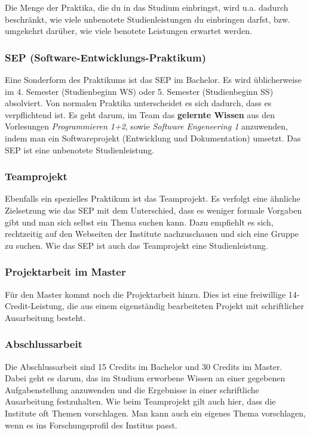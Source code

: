 	Die Menge der Praktika, die du in das Studium einbringst, wird u.a. dadurch beschränkt, wie viele unbenotete Studienleistungen du einbringen darfst, bzw. umgekehrt darüber, wie viele benotete Leistungen erwartet werden.

	\subsubsection*{SEP (Software-Entwicklungs-Praktikum)}
	Eine Sonderform des Praktikums ist das SEP im Bachelor. Es wird üblicherweise im 4. Semester (Studienbeginn WS) oder 5. Semester (Studienbeginn SS) absolviert. Von normalen Praktika unterscheidet es sich dadurch, dass es verpflichtend ist. Es geht darum, im Team das \textbf{gelernte Wissen} aus den Vorlesungen \emph{Programmieren 1+2}, sowie \emph{Software Engeneering 1} anzuwenden, indem man ein Softwareprojekt (Entwicklung und Dokumentation) umsetzt. Das SEP ist eine unbenotete Studienleistung.

	\subsubsection*{Teamprojekt}
	Ebenfalls ein spezielles Praktikum ist das Teamprojekt. Es verfolgt eine ähnliche Zielsetzung wie das SEP mit dem Unterschied, dass es weniger formale Vorgaben gibt und man sich selbst ein Thema suchen kann. Dazu empfiehlt es sich, rechtzeitig auf den Webseiten der Institute nachzuschauen und sich eine Gruppe zu suchen. Wie das SEP ist auch das Teamprojekt eine Studienleistung.

	\subsubsection{Projektarbeit im Master}
	Für den Master kommt noch die Projektarbeit hinzu. Dies ist eine
	freiwillige 14-Credit-Leistung, die aus einem eigenständig
	bearbeiteten Projekt mit schriftlicher Ausarbeitung besteht.

	\subsubsection{Abschlussarbeit}
	Die Abschlussarbeit sind 15 Credits im Bachelor und 30 Credits im Master. Dabei geht es darum, das im Studium erworbene Wissen an einer gegebenen Aufgabenstellung anzuwenden und die Ergebnisse in einer schriftliche Ausarbeitung festzuhalten. Wie beim Teamprojekt gilt auch hier, dass die Institute oft Themen vorschlagen.  Man kann auch ein eigenes Thema vorschlagen, wenn es ins Forschungsprofil des Institus passt. 
